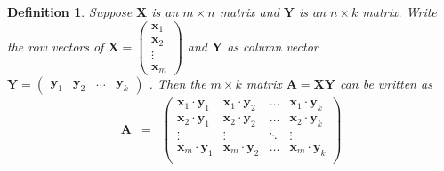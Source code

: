 \documentclass{beamer}
\newtheorem{defn}{Definition}
\numberwithin{equation}{section}
\begin{document}
\begin{frame}

\begin{defn} Suppose $\boldsymbol{X}$ is an $m \times n$ matrix and $\boldsymbol{Y}$ is an $n \times k$ matrix. Write the row vectors of $\boldsymbol{X} = \begin{pmatrix} \boldsymbol{x}_{1} \\ \boldsymbol{x}_{2} \\ \vdots\\ \boldsymbol{x}_{m} \end{pmatrix} $ and $\boldsymbol{Y}$ as column vector $\boldsymbol{Y} = \begin{pmatrix} \boldsymbol{y}_{1} & \boldsymbol{y}_{2} & \hdots & \boldsymbol{y}_{k} \end{pmatrix}$ .  Then the $m \times k$ matrix $\boldsymbol{A} = \boldsymbol{X} \boldsymbol{Y}$ can be written as 
\begin{eqnarray}
\boldsymbol{A} & = & \begin{pmatrix} 
								\boldsymbol{x}_{1} \cdot \boldsymbol{y}_{1} & \boldsymbol{x}_{1} \cdot  \boldsymbol{y}_{2} & \hdots & \boldsymbol{x}_{1} \cdot  \boldsymbol{y}_{k}\\
								\boldsymbol{x}_{2} \cdot  \boldsymbol{y}_{1} & \boldsymbol{x}_{2} \cdot  \boldsymbol{y}_{2} & \hdots & \boldsymbol{x}_{2}\cdot  \boldsymbol{y}_{k}\\
								\vdots & \vdots & \ddots & \vdots \\
								\boldsymbol{x}_{m} \cdot  \boldsymbol{y}_{1} & \boldsymbol{x}_{m} \cdot \boldsymbol{y}_{2} & \hdots & \boldsymbol{x}_{m} \cdot  \boldsymbol{y}_{k}\\
								\end{pmatrix}  \nonumber 
\end{eqnarray}

\end{defn}

\end{frame}
\end{document}
